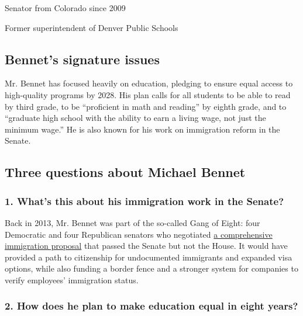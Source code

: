 Senator from Colorado since 2009

Former superintendent of Denver Public Schools

\hypertarget{bennets-signature-issues}{%
\subsection{Bennet's signature issues}\label{bennets-signature-issues}}

Mr. Bennet has focused heavily on education, pledging to ensure equal
access to high-quality programs by 2028. His plan calls for all students
to be able to read by third grade, to be ``proficient in math and
reading'' by eighth grade, and to ``graduate high school with the
ability to earn a living wage, not just the minimum wage.'' He is also
known for his work on immigration reform in the Senate.

\hypertarget{three-questions-about-michael-bennet}{%
\subsection{Three questions about Michael
Bennet}\label{three-questions-about-michael-bennet}}

\hypertarget{1-whats-this-about-his-immigration-work-in-the-senate}{%
\subsubsection{\texorpdfstring{\textbf{1. What's this about his
immigration work in the
Senate?}}{1. What's this about his immigration work in the Senate?}}\label{1-whats-this-about-his-immigration-work-in-the-senate}}

Back in 2013, Mr. Bennet was part of the so-called Gang of Eight: four
Democratic and four Republican senators who negotiated
\href{https://www.nytimes.com/2019/06/27/us/politics/michael-bennet-immigration.html}{a
comprehensive immigration proposal} that passed the Senate but not the
House. It would have provided a path to citizenship for undocumented
immigrants and expanded visa options, while also funding a border fence
and a stronger system for companies to verify employees' immigration
status.

\hypertarget{2-how-does-he-plan-to-make-education-equal-in-eight-years}{%
\subsubsection{\texorpdfstring{\textbf{2. How does he plan to make
education equal in eight
years?}}{2. How does he plan to make education equal in eight years?}}\label{2-how-does-he-plan-to-make-education-equal-in-eight-years}}

